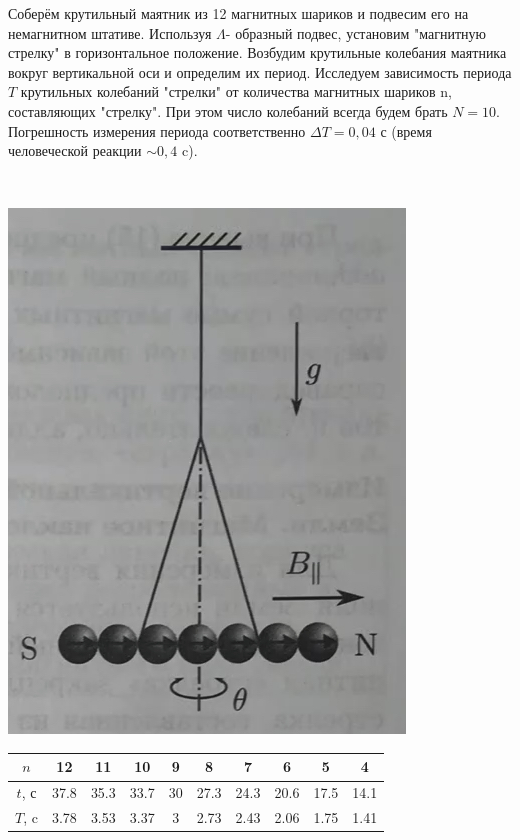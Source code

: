 \documentclass[a4paper,12pt]{article}
\begin{document}
\begin{minipage}{0.45\textwidth}
Соберём крутильный маятник из 12 магнитных шариков и подвесим его на немагнитном штативе. Используя $\Lambda$- образный подвес, установим "магнитную стрелку" в горизонтальное положение.
Возбудим крутильные колебания маятника вокруг вертикальной оси и определим их период. Исследуем зависимость периода $T$ крутильных колебаний "стрелки" от количества магнитных шариков n, составляющих "стрелку". При этом число колебаний
всегда будем брать $N = 10$. Погрешность измерения периода соответственно
$\Delta T = 0,04$ с (время человеческой реакции $\sim 0,4$ c).
\end{minipage}
\begin{minipage}{0.1\textwidth}
\
\end{minipage}
\begin{minipage}{0.45\textwidth}
\begin{center}
\includegraphics[width=0.7\linewidth]{3.jpg}\\
\end{center}
\end{minipage}

\begin{table}[h]
\begin{tabular}{|c|c|c|c|c|c|c|c|c|c|}
\hline
$n$    & 12   & 11   & 10   & 9  & 8    & 7    & 6    & 5    & 4    \\ \hline
$t$, с & 37.8 & 35.3 & 33.7 & 30 & 27.3 & 24.3 & 20.6 & 17.5 & 14.1 \\ \hline
$T$, c & 3.78 & 3.53 & 3.37 & 3  & 2.73 & 2.43 & 2.06 & 1.75 & 1.41 \\ \hline
\end{tabular}
\end{table}
\end{document}
